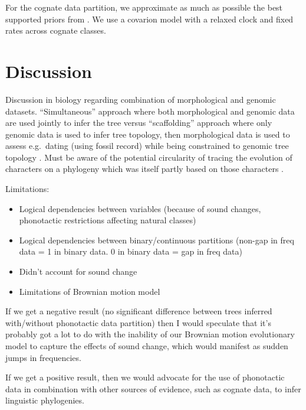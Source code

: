 \documentclass[]{article}
\providecommand{\tightlist}{%
  \setlength{\itemsep}{0pt}\setlength{\parskip}{0pt}}
\begin{document}
For the cognate data partition, we approximate as much as possible the best supported priors from \textcite{bouckaert_origin_2018}. We use a covarion model with a relaxed clock and fixed rates across cognate classes.

\hypertarget{pn-tree-discussion}{%
\section{Discussion}\label{pn-tree-discussion}}

Discussion in biology regarding combination of morphological and genomic datasets. ``Simultaneous'' approach where both morphological and genomic data are used jointly to infer the tree versus ``scaffolding'' approach where only genomic data is used to infer tree topology, then morphological data is used to assess e.g.~dating (using fossil record) while being constrained to genomic tree topology \autocite{lee_morphological_2015}. Must be aware of the potential circularity of tracing the evolution of characters on a phylogeny which was itself partly based on those characters \autocite{de_queiroz_including_1996}.

Limitations:

\begin{itemize}
\tightlist
\item
  Logical dependencies between variables (because of sound changes, phonotactic restrictions affecting natural classes)
\item
  Logical dependencies between binary/continuous partitions (non-gap in freq data = 1 in binary data. 0 in binary data = gap in freq data)
\item
  Didn't account for sound change
\item
  Limitations of Brownian motion model
\end{itemize}

If we get a negative result (no significant difference between trees inferred with/without phonotactic data partition) then I would speculate that it's probably got a lot to do with the inability of our Brownian motion evolutionary model to capture the effects of sound change, which would manifest as sudden jumps in frequencies.

If we get a positive result, then we would advocate for the use of phonotactic data in combination with other sources of evidence, such as cognate data, to infer linguistic phylogenies.
\end{document}
